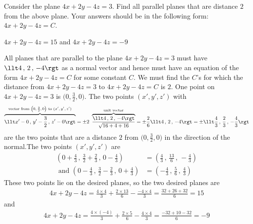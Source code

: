 \begin{question}[M200 2015D] %
Consider the plane $4x + 2y - 4z = 3$. Find all parallel planes that 
are distance $2$ from the above plane. Your answers should be in the 
following form: $4x + 2y - 4z = C$.
\end{question}

%

\begin{answer}
$4x + 2y - 4z=15$ and $4x + 2y - 4z=-9$ \qquad
\end{answer}

\begin{solution}
All planes that are parallel to the plane $4x + 2y - 4z = 3$
must have $\llt 4\,,\,2\,,\,-4\rgt$ as a normal vector and
hence must have an equation of the form $4x + 2y - 4z = C$
for some constant $C$. We must find the $C$'s for which the distance
from  $4x + 2y - 4z = 3$ to $4x + 2y - 4z = C$ is $2$. 
One point on $4x + 2y - 4z = 3$ is $\big(0,\frac{3}{2},0\big)$.
The two points $(x',y',z')$ with
\begin{align*}
\overbrace{\llt x'-0\,,\,y'-\frac{3}{2}\,,\,z'-0\rgt}^{\text{vector from 
$\big(0,\frac{3}{2},0\big)$ to $(x',y',z')$}}
=\pm 2\ \overbrace{\frac{\llt 4\,,\,2\,,\,-4\rgt}{\sqrt{16+4+16}}}^{\text{unit vector}}
=\pm \frac{2}{6} \llt 4\,,\,2\,,\,-4\rgt
=\pm\llt \frac{4}{3}\,,\,\frac{2}{3}\,,\,-\frac{4}{3}\rgt
\end{align*}
are the two points that are a distance $2$ from $\big(0,\frac{3}{2},0\big)$
in the direction of the normal.The two points $(x',y',z')$ are
\begin{align*}
\left(0+\frac{4}{3}\,,\, \frac{3}{2}+\frac{2}{3}\,,\,0-\frac{4}{3}\right)
&=\left(\frac{4}{3}\,,\, \frac{13}{6}\,,\,-\frac{4}{3}\right) \\\text{ and }
\left(0-\frac{4}{3}\,,\, \frac{3}{2}-\frac{2}{3}\,,\,0+\frac{4}{3}\right)
&=\left(-\frac{4}{3}\,,\, \frac{5}{6}\,,\,\frac{4}{3}\right)
\end{align*}
These two points lie on the desired planes, so the two desired planes are
\begin{align*}
4x + 2y - 4z
=\frac{4\times 4}{3} +\frac{2\times 13}{6}-\frac{-4\times 4}{3}
=\frac{32+26+32}{6}
=15
\end{align*}
and 
\begin{align*}
4x + 2y - 4z
=\frac{4\times(-4)}{3} +\frac{2\times 5}{6}-\frac{4\times 4}{3}
=\frac{-32+10-32}{6}
=-9
\end{align*}
\end{solution}

